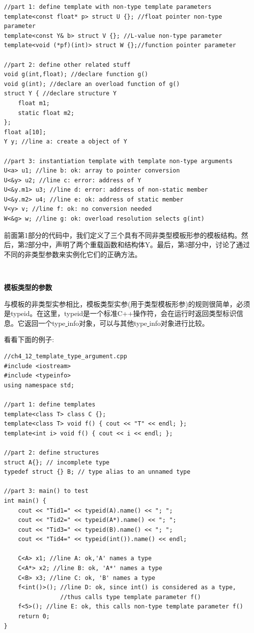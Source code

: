 \begin{lstlisting}[caption={}]
//part 1: define template with non-type template parameters
template<const float* p> struct U {}; //float pointer non-type parameter
template<const Y& b> struct V {}; //L-value non-type parameter
template<void (*pf)(int)> struct W {};//function pointer parameter

//part 2: define other related stuff
void g(int,float); //declare function g()
void g(int); //declare an overload function of g()
struct Y { //declare structure Y
	float m1;
	static float m2;
};
float a[10];
Y y; //line a: create a object of Y

//part 3: instantiation template with template non-type arguments
U<a> u1; //line b: ok: array to pointer conversion
U<&y> u2; //line c: error: address of Y
U<&y.m1> u3; //line d: error: address of non-static member
U<&y.m2> u4; //line e: ok: address of static member
V<y> v; //line f: ok: no conversion needed
W<&g> w; //line g: ok: overload resolution selects g(int)
\end{lstlisting}

前面第1部分的代码中，我们定义了三个具有不同非类型模板形参的模板结构。然后，第2部分中，声明了两个重载函数和结构体Y。最后，第3部分中，讨论了通过不同的非类型参数来实例化它们的正确方法。\par

\noindent\textbf{}\ \par
\textbf{模板类型的参数} \ \par
与模板的非类型实参相比，模板类型实参(用于类型模板形参)的规则很简单，必须是typeid。在这里，typeid是一个标准C++操作符，会在运行时返回类型标识信息。它返回一个type\underline{ }info对象，可以与其他type\underline{ }info对象进行比较。 \par
看看下面的例子: \par

\begin{lstlisting}[caption={}]
//ch4_12_template_type_argument.cpp
#include <iostream>
#include <typeinfo>
using namespace std;

//part 1: define templates
template<class T> class C {};
template<class T> void f() { cout << "T" << endl; };
template<int i> void f() { cout << i << endl; };

//part 2: define structures
struct A{}; // incomplete type
typedef struct {} B; // type alias to an unnamed type

//part 3: main() to test
int main() {
	cout << "Tid1=" << typeid(A).name() << "; ";
	cout << "Tid2=" << typeid(A*).name() << "; ";
	cout << "Tid3=" << typeid(B).name() << "; ";
	cout << "Tid4=" << typeid(int()).name() << endl;
	
	C<A> x1; //line A: ok,'A' names a type
	C<A*> x2; //line B: ok, 'A*' names a type
	C<B> x3; //line C: ok, 'B' names a type
	f<int()>(); //line D: ok, since int() is considered as a type,
				//thus calls type template parameter f()
	f<5>(); //line E: ok, this calls non-type template parameter f()
	return 0;
}
\end{lstlisting}

